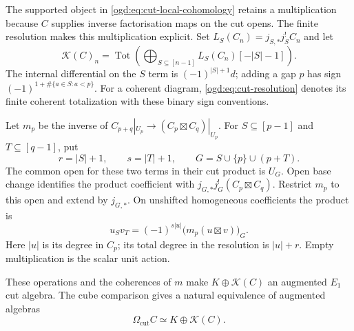 The supported object in \eqref{ogd:eq:cut-local-cohomology} retains a
multiplication because $C$ supplies inverse factorisation maps on the
cut opens. The finite resolution makes this multiplication explicit.
Set\label{ogd:def:cut-localization-terms} $L_S(C_n)=j_{S,*}j_S^!C_n$ and let
\begin{equation}\label{ogd:eq:cut-resolution}
 \mathcal K(C)_n=\operatorname{Tot}
   \left(\bigoplus_{S\subseteq[n-1]}L_S(C_n)[-|S|-1]\right).
\end{equation}
The internal differential on the $S$ term is $(-1)^{|S|+1}d$;
adding a gap $p$ has sign $(-1)^{1+\#\{a\in S:a<p\}}$.
For a coherent diagram, \eqref{ogd:eq:cut-resolution} denotes its finite
coherent totalization with these binary sign conventions.

Let\label{ogd:def:cut-resolution-product-data} $m_p$ be the inverse of $C_{p+q}|_{U_p}\to(C_p\boxtimes C_q)|_{U_p}$.
For $S\subseteq[p-1]$ and $T\subseteq[q-1]$, put
\[
 r=|S|+1,\qquad s=|T|+1,\qquad
 G=S\cup\{p\}\cup(p+T).
\]
The common open for these two terms in their cut product is $U_G$.
Open base change identifies the product coefficient with
$j_{G,*}j_G^!(C_p\boxtimes C_q)$. Restrict $m_p$ to this open and
extend by $j_{G,*}$. On unshifted homogeneous coefficients the product is
\begin{equation}\label{ogd:eq:cut-resolution-product}
 u_Sv_T=(-1)^{s|u|}\bigl(m_p(u\boxtimes v)\bigr)_G.
\end{equation}
Here $|u|$ is its degree in $C_p$; its total degree in the resolution is
$|u|+r$. Empty multiplication is the scalar unit action.

\begin{proposition}\label{ogd:prop:cut-resolution-algebra}
These operations and the coherences of $m$ make $K\oplus\mathcal K(C)$
an augmented $E_1$ cut algebra. The cube comparison gives a natural
equivalence of augmented algebras
\[
 \Omega_{\mathrm{cut}}C\simeq K\oplus\mathcal K(C).
\]
\end{proposition}

